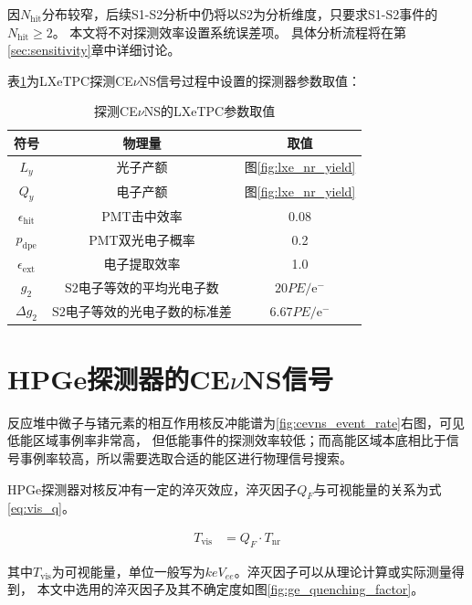 因$N_\mathrm{hit}$分布较窄，后续S1-S2分析中仍将以$\mathrm{S2}$为分析维度，只要求S1-S2事件的$N_\mathrm{hit}\ge2$。
本文将不对探测效率设置系统误差项。
具体分析流程将在第\ref{sec:sensitivity}章中详细讨论。

表\ref{tab:lxe_tpc_parameters}为LXeTPC探测CE$\nu$NS信号过程中设置的探测器参数取值：

\begin{table}
  \centering
  \caption{探测CE$\nu$NS的LXeTPC参数取值}
  \begin{tabular}{ccc}
    \toprule
    符号 & 物理量 & 取值 \\
    \midrule
    $L_y$ & 光子产额 & 图\ref{fig:lxe_nr_yield} \\
    $Q_y$ & 电子产额 & 图\ref{fig:lxe_nr_yield} \\
    $\epsilon_\mathrm{hit}$ & PMT击中效率 & 0.08 \\
    $p_\mathrm{dpe}$ & PMT双光电子概率 & 0.2 \\
    $\epsilon_\mathrm{ext}$ & 电子提取效率 & 1.0 \\
    $g_2$ & $\mathrm{S2}$电子等效的平均光电子数 & $20\si{PE/\mathrm{e}^-}$ \\
    $\Delta g_2$ & $\mathrm{S2}$电子等效的光电子数的标准差 & $6.67\si{PE/\mathrm{e}^-}$ \\
    \bottomrule
  \end{tabular}
  \label{tab:lxe_tpc_parameters}
\end{table}

\section{HPGe探测器的CE$\nu$NS信号}
\label{sec:hpge_sig}

反应堆中微子与锗元素的相互作用核反冲能谱为\ref{fig:cevns_event_rate}右图，可见低能区域事例率非常高，
但低能事件的探测效率较低；而高能区域本底相比于信号事例率较高，所以需要选取合适的能区进行物理信号搜索。

HPGe探测器对核反冲有一定的淬灭效应，淬灭因子$Q_F$与可视能量的关系为式\ref{eq:vis_q}。

\begin{align}
  \label{eq:vis_q}
  T_\mathrm{vis} &= Q_F\cdot T_\mathrm{nr}
\end{align}

其中$T_\mathrm{vis}$为可视能量，单位一般写为$\si{keV_{ee}}$。淬灭因子可以从理论计算或实际测量得到\cite{zhao_search_2016}，
本文中选用的淬灭因子及其不确定度如图\ref{fig:ge_quenching_factor}。


